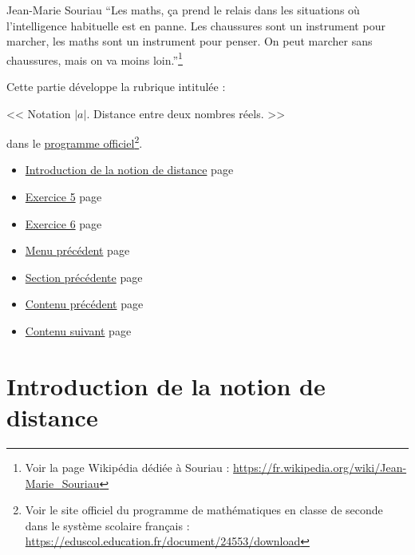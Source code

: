 \documentclass[a4paper,11pt]{book}
\begin{document}
\begin{myquote}{Jean-Marie Souriau}
\enquote{Les maths, ça prend le relais dans les situations où l’intelligence
habituelle est en panne. Les chaussures sont un instrument pour
marcher, les maths sont un instrument pour penser. On peut
marcher sans chaussures, mais on va moins loin.}\footnote{Voir la page Wikipédia dédiée à Souriau : \url{https://fr.wikipedia.org/wiki/Jean-Marie_Souriau}}
\end{myquote}


\clearpage

Cette partie développe la rubrique intitulée :

<< Notation \(\lvert a \rvert\). Distance entre deux nombres réels. >>

dans le \href{https://eduscol.education.fr/document/24553/download}{programme officiel}\footnote{Voir le site officiel du programme de mathématiques
en classe de seconde dans le système scolaire français :
\url{https://eduscol.education.fr/document/24553/download}}.

\clearpage


\label{org68323fe}
\label{page:content3-menu}
\begin{itemize}
\item \hyperref[orged79065]{Introduction de la notion de distance}
page~\pageref{page:sec2.3.1intro-distance}
\item \hyperref[org65c295d]{Exercice 5}
page~\pageref{page:sec2.3.2exo5}
\item \hyperref[org4ecd154]{Exercice 6}
page~\pageref{page:sec2.3.3exo6}
\item \hyperref[org2ce8f1f]{Menu précédent}
page~\pageref{page:content-menu}
\item \hyperref[org2b18515]{Section précédente}
page~\pageref{page:sec2.2.4small-game}
\item \hyperref[org31d1c9a]{Contenu précédent}
page~\pageref{page:sec2.2content2}
\item \hyperref[orgbdb89e7]{Contenu suivant}
page~\pageref{page:sec2.4content4}
\end{itemize}

\clearpage

\section{Introduction de la notion de distance}
\label{sec:org3f2017e}
\label{orged79065}
\label{page:sec2.3.1intro-distance}
\end{document}
